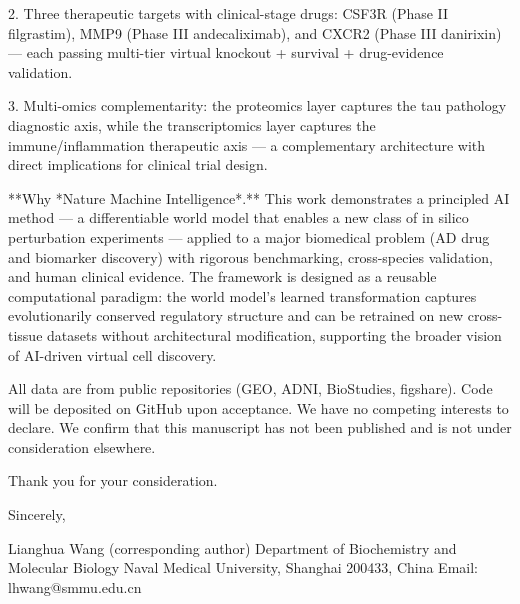 2. Three therapeutic targets with clinical-stage drugs: CSF3R (Phase II filgrastim), MMP9 (Phase III andecaliximab), and CXCR2 (Phase III danirixin) — each passing multi-tier virtual knockout + survival + drug-evidence validation.

3. Multi-omics complementarity: the proteomics layer captures the tau pathology diagnostic axis, while the transcriptomics layer captures the immune/inflammation therapeutic axis — a complementary architecture with direct implications for clinical trial design.

**Why *Nature Machine Intelligence*.** This work demonstrates a principled AI method — a differentiable world model that enables a new class of in silico perturbation experiments — applied to a major biomedical problem (AD drug and biomarker discovery) with rigorous benchmarking, cross-species validation, and human clinical evidence. The framework is designed as a reusable computational paradigm: the world model's learned transformation captures evolutionarily conserved regulatory structure and can be retrained on new cross-tissue datasets without architectural modification, supporting the broader vision of AI-driven virtual cell discovery.

All data are from public repositories (GEO, ADNI, BioStudies, figshare). Code will be deposited on GitHub upon acceptance. We have no competing interests to declare. We confirm that this manuscript has not been published and is not under consideration elsewhere.

Thank you for your consideration.

Sincerely,

Lianghua Wang (corresponding author)
Department of Biochemistry and Molecular Biology
Naval Medical University, Shanghai 200433, China
Email: lhwang@smmu.edu.cn
